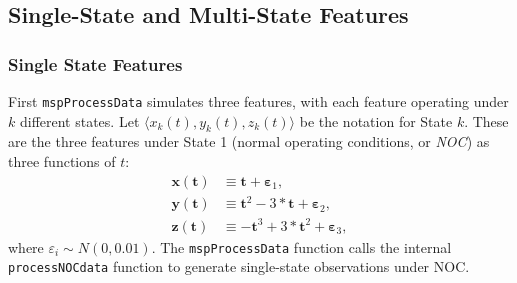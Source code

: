 \documentclass{report}\usepackage[]{graphicx}\usepackage[]{color}
\begin{document}
\subsection{Single-State and Multi-State Features}

\subsubsection{Single State Features}
First \texttt{mspProcessData} simulates three features, with each feature operating under $k$ different states. Let $\langle x_k(t), y_k(t), z_k(t) \rangle$ be the notation for State $k$. These are the three features under State 1 (normal operating conditions, or \emph{NOC}) as three functions of $t$:
\begin{align}
\textbf{x}(\textbf{t}) &\equiv \textbf{t} + \boldsymbol\varepsilon_1, \\
\textbf{y}(\textbf{t}) &\equiv \textbf{t} ^ 2 - 3 * \textbf{t} + \boldsymbol\varepsilon_2, \\
\textbf{z}(\textbf{t}) &\equiv -\textbf{t} ^ 3 + 3 * \textbf{t} ^ 2 + \boldsymbol\varepsilon_3,
\end{align}
where $\varepsilon_i \sim N(0, 0.01)$. The \texttt{mspProcessData} function calls the internal \texttt{processNOCdata} function to generate single-state observations under NOC.
\end{document}
